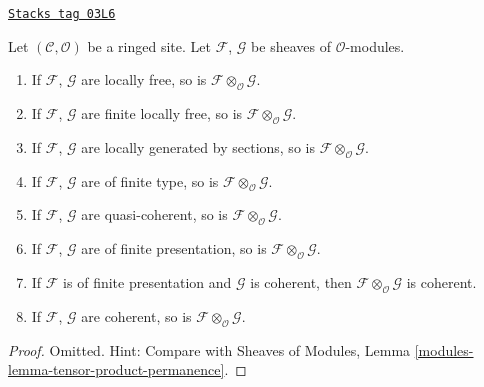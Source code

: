 \begin{lemma}
\label{sites-modules-lemma-tensor-product-permanence}
\href{https://stacks.math.columbia.edu/tag/03L6}{\texttt{Stacks tag 03L6}}

Let $(\mathcal{C}, \mathcal{O})$ be a ringed site.
Let $\mathcal{F}$, $\mathcal{G}$ be sheaves of $\mathcal{O}$-modules.
\begin{enumerate}
\item If $\mathcal{F}$, $\mathcal{G}$ are locally free,
so is $\mathcal{F} \otimes_\mathcal{O} \mathcal{G}$.
\item If $\mathcal{F}$, $\mathcal{G}$ are finite locally free,
so is $\mathcal{F} \otimes_\mathcal{O} \mathcal{G}$.
\item If $\mathcal{F}$, $\mathcal{G}$ are locally generated
by sections, so is $\mathcal{F} \otimes_\mathcal{O} \mathcal{G}$.
\item If $\mathcal{F}$, $\mathcal{G}$ are of finite type,
so is $\mathcal{F} \otimes_\mathcal{O} \mathcal{G}$.
\item If $\mathcal{F}$, $\mathcal{G}$ are quasi-coherent,
so is $\mathcal{F} \otimes_\mathcal{O} \mathcal{G}$.
\item If $\mathcal{F}$, $\mathcal{G}$ are of finite presentation,
so is $\mathcal{F} \otimes_\mathcal{O} \mathcal{G}$.
\item If $\mathcal{F}$ is of finite presentation and $\mathcal{G}$ is coherent,
then $\mathcal{F} \otimes_\mathcal{O} \mathcal{G}$ is coherent.
\item If $\mathcal{F}$, $\mathcal{G}$ are coherent,
so is $\mathcal{F} \otimes_\mathcal{O} \mathcal{G}$.
\end{enumerate}
\end{lemma}

\begin{proof}
Omitted. Hint: Compare with
Sheaves of Modules, Lemma \ref{modules-lemma-tensor-product-permanence}.
\end{proof}


